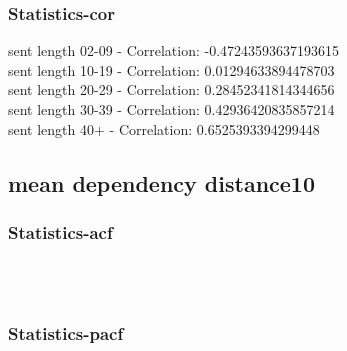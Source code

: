\documentclass{article}%
\begin{document}
%
\newpage%
\subsubsection{Statistics{-}cor}%
\label{ssubsec:Statistics{-}cor}%
\noindent%
sent length 02-09 - Correlation: -0.47243593637193615\\%
sent length 10-19 - Correlation: 0.01294633894478703\\%
sent length 20-29 - Correlation: 0.28452341814344656\\%
sent length 30-39 - Correlation: 0.42936420835857214\\%
sent length 40+ - Correlation: 0.6525393394299448\\

%
\newpage

%
\subsection{mean dependency distance10}%
\label{subsec:meandependencydistance10}%
\subsubsection{Statistics{-}acf}%
\label{ssubsec:Statistics{-}acf}%


\begin{figure}[ht]%
\centering%
\setlength{\abovecaptionskip}{-35pt}%
%
%
\\%
%
%
\\%
%
\end{figure}

%
\newpage%
\subsubsection{Statistics{-}pacf}%
\label{ssubsec:Statistics{-}pacf}%
\end{document}
